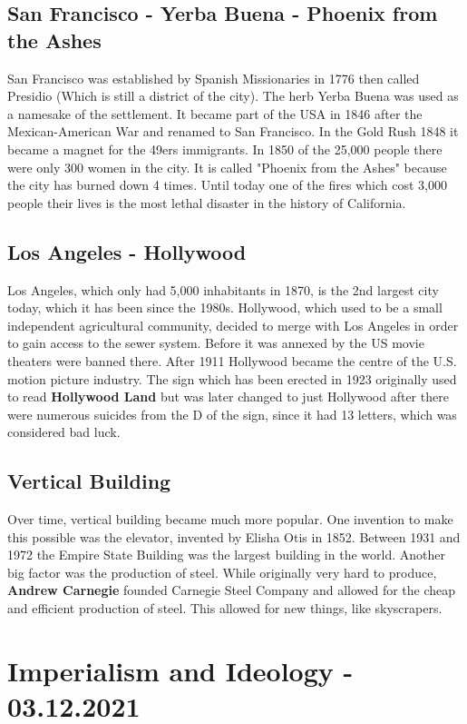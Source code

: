 \documentclass{article}
\begin{document}
	\subsection{San Francisco - Yerba Buena - Phoenix from the Ashes}
	San Francisco was established by Spanish Missionaries in 1776 then called Presidio (Which is still a district of the city). The herb Yerba Buena was used as a namesake of the settlement. It became part of the USA in 1846 after the Mexican-American War and renamed to San Francisco. In the Gold Rush 1848 it became a magnet for the 49ers immigrants. In 1850 of the 25,000 people there were only 300 women in the city. It is called "Phoenix from the Ashes" because the city has burned down 4 times. Until today one of the fires which cost 3,000 people their lives is the most lethal disaster in the history of California. \\
	\subsection{Los Angeles - Hollywood}
	Los Angeles, which only had 5,000 inhabitants in 1870, is the 2nd largest city today, which it has been since the 1980s. Hollywood, which used to be a small independent agricultural community, decided to merge with Los Angeles in order to gain access to the sewer system. Before it was annexed by the US movie theaters were banned there. After 1911 Hollywood became the centre of the U.S. motion picture industry. The sign which has been erected in 1923 originally used to read \textbf{Hollywood Land} but was later changed to just Hollywood after there were numerous suicides from the D of the sign, since it had 13 letters, which was considered bad luck. \\
	\subsection{Vertical Building}
	Over time, vertical building became much more popular. One invention to make this possible was the elevator, invented by Elisha Otis in 1852. Between 1931 and 1972 the Empire State Building was the largest building in the world.
	Another big factor was the production of steel. While originally very hard to produce, \textbf{Andrew Carnegie} founded Carnegie Steel Company and allowed for the cheap and efficient production of steel. This allowed for new things, like skyscrapers. \\
	
	\section{Imperialism and Ideology - 03.12.2021}
\end{document}
